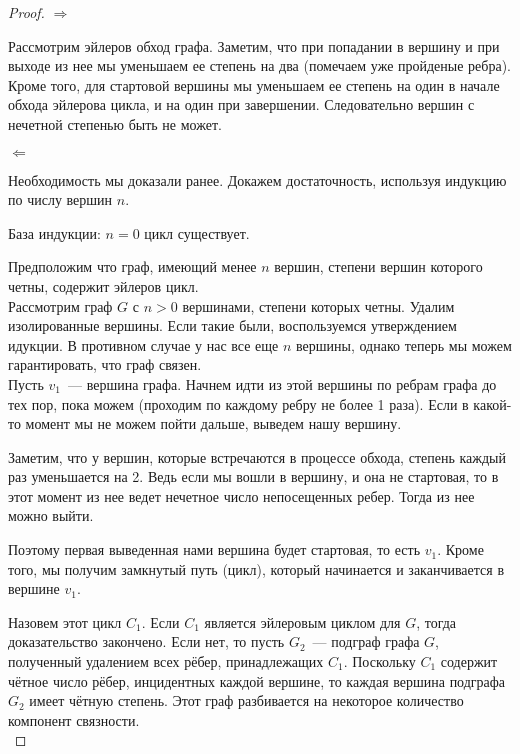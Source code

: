 \begin{proof}
    $\Rightarrow$
    
    Рассмотрим эйлеров обход графа. Заметим, что при попадании в вершину и при выходе из нее мы уменьшаем ее степень на два (помечаем уже пройденые ребра). Кроме того, для стартовой вершины мы уменьшаем ее степень на один в начале обхода эйлерова цикла, и на один при завершении. Следовательно вершин с нечетной степенью быть не может.
    
    $\Leftarrow$
    
    Необходимость мы доказали ранее. Докажем достаточность, используя индукцию по числу вершин $n$.

    База индукции: $n = 0$ цикл существует.

    Предположим что граф, имеющий менее $n$ вершин, степени вершин которого четны, содержит эйлеров цикл. \\
    
    Рассмотрим граф $G$ с $n > 0$ вершинами, степени которых четны. Удалим изолированные вершины. Если такие были, воспользуемся утверждением идукции. В противном случае у нас все еще $n$ вершины, однако теперь мы можем гарантировать, что граф связен. \\
    
    Пусть $v_1$~--- вершина графа. Начнем идти из этой вершины по ребрам графа до тех пор, пока можем (проходим по каждому ребру не более 1 раза). Если в какой-то момент мы не можем пойти дальше, выведем нашу вершину.
    
    
    
    Заметим, что у вершин, которые встречаются в процессе обхода, степень каждый раз уменьшается на 2. Ведь если мы вошли в вершину, и она не стартовая, то в этот момент из нее ведет нечетное число непосещенных ребер. Тогда из нее можно выйти.
    
    Поэтому первая выведенная нами вершина будет стартовая, то есть $v_1$. Кроме того, мы получим замкнутый путь (цикл), который начинается и заканчивается в вершине $v_1$.
    
    Назовем этот цикл $C_1$. Если $C_1$ является эйлеровым циклом для $G$, тогда доказательство закончено. Если нет, то пусть $G_2$~--- подграф графа $G$, полученный удалением всех рёбер, принадлежащих $C_1$. Поскольку $C_1$ содержит чётное число рёбер, инцидентных каждой вершине, то каждая вершина подграфа $G_2$ имеет чётную степень. Этот граф разбивается на некоторое количество компонент связности.\\


\end{proof}
